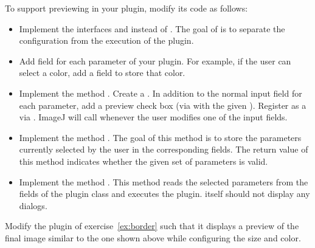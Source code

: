 \documentclass{book}
\begin{document}
To support previewing in your plugin, modify its code as follows:
\begin{itemize}
 \item Implement the interfaces  and  instead of . The goal of  is to separate the configuration from the execution of the plugin.
 \item Add field for each parameter of your plugin. For example, if the user can select a color, add a field to store that color.
 \item Implement the method . Create a . In addition to the normal input field for each parameter, add a preview check box (via  with the given ). Register  as a  via . ImageJ will call  whenever the user modifies one of the input fields.  
  \item Implement the method . The goal of this method is to store the parameters currently selected by the user in the corresponding fields. The return value of this method indicates whether the given set of parameters is valid. 
   \item Implement the method . This method reads the selected parameters from the fields of the plugin class and executes the plugin.  itself should not display any dialogs.
\end{itemize}

\begin{exercise}
Modify the plugin of exercise~\ref{ex:border} such that it displays a preview of the final image similar to the one shown above while configuring the size and color. 
\end{exercise}
\end{document}
